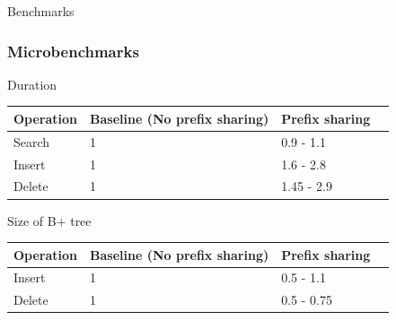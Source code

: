 \documentclass{beamer}
\begin{document}
  \begin{section}{Benchmarks}

    
    \begin{frame}
      \frametitle{Microbenchmarks}
        
        \begin{block}{Duration}
        
        \end{block}
       \begin{tabular}{| l | l | l | l |}
        \hline
        Operation & Baseline (No prefix sharing) & Prefix sharing \\ \hline 
        Search & 1 & 0.9 - 1.1  \\ \hline 
        Insert & 1 & 1.6 - 2.8  \\ \hline 
        Delete & 1 & 1.45 - 2.9  \\ \hline 
      \end{tabular}
      
        \begin{block}{
        Size of B+ tree}
        \end{block}
       \begin{tabular}{| l | l | l | l |}
        \hline
        Operation & Baseline (No prefix sharing) & Prefix sharing \\ \hline 
        Insert & 1 & 0.5 - 1.1  \\ \hline 
        Delete & 1 & 0.5 - 0.75  \\ \hline 
      \end{tabular}
    \end{frame}
    

\end{section}
\end{document}
